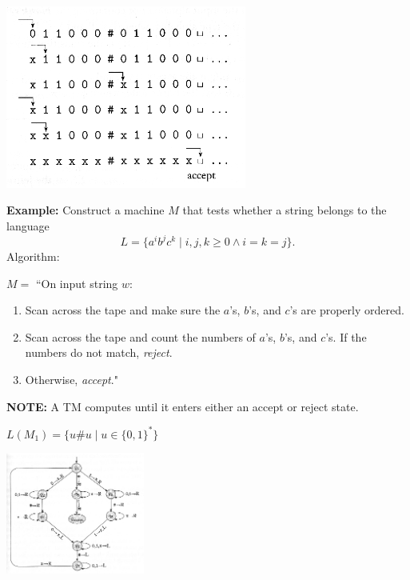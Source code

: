\documentclass[a4paper,blends,pdf,colorBG,slideColor]{prosper}
\begin{document}
\begin{center}
\includegraphics[height=60mm]{images/tm-computing.eps}
\end{center}
\es

{\bf Example:} Construct a machine $M$ that tests whether a string belongs to the language
\[
L = \{ a^ib^jc^k \mid i,j,k \ge 0 \wedge i=k=j\}.
\]
Algorithm:

$M = $ ``On input string $w$:
\begin{enumerate}
\item Scan across the tape and make sure the $a$'s, $b$'s, and $c$'s are properly ordered.
\item Scan across the tape and count the numbers of $a$'s, $b$'s, and $c$'s.
 If the numbers do not match, {\em reject}.  
\item Otherwise, {\em accept}."
\end{enumerate}

\es

\begin{center}
\end{center}

{\bf NOTE:} A TM computes until it enters either an accept or reject state.


\es

$L(M_1) = \{u\#u \mid u \in \{0,1\}^*\}$

\begin{center}
\includegraphics[height=40mm]{images/tm-m1.eps}
\end{center}
\end{document}
